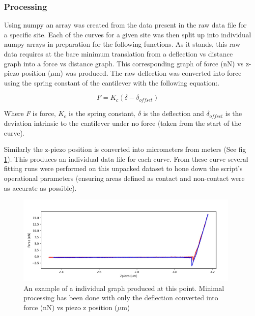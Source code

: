 
\subsubsection{Processing}

Using numpy\cite{numpy} an array was created from the data present in the raw data file for a specific site. Each of the curves for a given site was then split up into individual numpy arrays in preparation for the following functions. As it stands, this raw data requires at the bare minimum translation from a deflection vs distance graph into a force vs distance graph. This corresponding graph of force (nN) vs z-piezo position ($\mu$m) was produced. The raw deflection was converted into force using the spring constant of the cantilever with the following equation:\cite{KcConst}. %

\begin{equation}
F = K_c(\delta - \delta _{offset})
\end{equation}

Where \textit{F} is force, $K_c$ is the spring constant, $\delta$ is the deflection and $\delta _{offset}$ is the deviation intrinsic to the cantilever under no force (taken from the start of the curve). %

Similarly the z-piezo position is converted into micrometers from meters (See fig \ref{fig:EgRawGraph}). This produces an individual data file for each curve. From these curve several fitting runs were performed on this unpacked dataset to hone down the script's operational parameters (ensuring areas defined as contact and non-contact were as accurate as possible).

\begin{figure}[h!]     %
        \begin{center}
          \includegraphics[width=110mm]{chapter4/EgRawGraph.jpg}
\end{center}
\caption{An example of a individual graph produced at this point. Minimal processing has been done with only the deflection converted into force (nN) vs piezo z position ($\mu$m)}
\label{fig:EgRawGraph}                 %
\end{figure}


